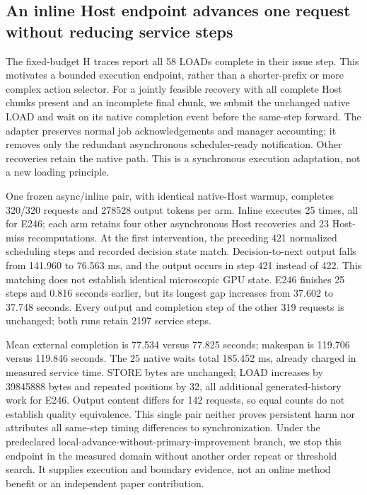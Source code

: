 \documentclass[10pt,a4paper]{article}
\begin{document}
\subsection{An inline Host endpoint advances one request without reducing service steps}
The fixed-budget H traces report all 58 LOADs complete in their issue step.
This motivates a bounded execution endpoint, rather than a shorter-prefix or
more complex action selector. For a jointly feasible recovery with all complete
Host chunks present and an incomplete final chunk, we submit the unchanged
native LOAD and wait on its native completion event before the same-step
forward. The adapter preserves normal job acknowledgements and manager
accounting; it removes only the redundant asynchronous scheduler-ready
notification. Other recoveries retain the native path. This is a synchronous
execution adaptation, not a new loading principle.

One frozen async/inline pair, with identical native-Host warmup, completes
320/320 requests and 278528 output tokens per arm. Inline executes 25 times,
all for E246; each arm retains four other asynchronous Host recoveries and
23 Host-miss recomputations. At the first intervention, the preceding 421
normalized scheduling steps and recorded decision state match. Decision-to-next
output falls from 141.960 to 76.563 ms, and the output occurs in step 421
instead of 422. This matching does not establish identical microscopic GPU
state. E246 finishes 25 steps and 0.816 seconds earlier, but its longest gap
increases from 37.602 to 37.748 seconds. Every output and completion step of
the other 319 requests is unchanged; both runs retain 2197 service steps.

Mean external completion is 77.534 versus 77.825 seconds; makespan is 119.706
versus 119.846 seconds. The 25 native waits total 185.452 ms, already charged
in measured service time. STORE bytes are unchanged; LOAD increases by
39845888 bytes and repeated positions by 32, all additional generated-history
work for E246. Output content differs for 142 requests, so equal counts do not
establish quality equivalence. This single pair neither proves persistent
harm nor attributes all same-step timing differences to synchronization.
Under the predeclared local-advance-without-primary-improvement branch, we
stop this endpoint in the measured domain without another order repeat or
threshold search. It supplies execution and boundary evidence, not an online
method benefit or an independent paper contribution.
\end{document}

